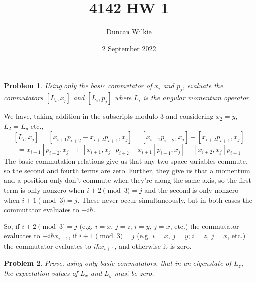\documentclass{article}
\title{4142 HW 1}
\author{Duncan Wilkie}
\date{2 September 2022}
\newtheorem{prob}{Problem}
\begin{document}
\maketitle

\begin{prob}
  Using only the basic commutator of $x_{i}$ and $p_{j}$, evaluate the commutators $[L_{i}, x_{j}]$ and $[L_{i}, p_{j}]$
  where $L_{i}$ is the angular momentum operator.
\end{prob}

We have, taking addition in the subscripts modulo 3 and considering $x_{2}=y$, $L_{2}=L_{y}$ etc.,
\[
  [L_{i}, x_{j}] = [x_{i+1}p_{i+2}-x_{i+2}p_{i+1}, x_{j}] = [x_{i+1}p_{i+2}, x_{j}] - [x_{i+2}p_{i+1}, x_{j}]
\]
\[
  = x_{i+1}[p_{i+2}, x_{j}] + [x_{i+1}, x_{j}]p_{i+2} - x_{i+1}[p_{i+1}, x_{j}] - [x_{i+2}, x_{j}]p_{i+1}
\]
The basic commutation relations give us that any two space variables commute, so the second and fourth terms are zero.
Further, they give us that a momentum and a position only don't commute when they're along the same axis,
so the first term is only nonzero when $i+2\pmod 3 = j$ and the second is only nonzero when $i+1\pmod 3 = j$.
These never occur simultaneously, but in both cases the commutator evaluates to $-i\hbar$.

So, if $i+2\pmod 3 = j$ (e.g. $i=x$, $j=z$; $i=y$, $j=x$, etc.) the commutator evaluates to $-i\hbar x_{i+1}$,
if $i+1\pmod 3 = j$ (e.g. $i=x$, $j=y$; $i=z$, $j=x$, etc.) the commutator evaluates to $i\hbar x_{i+1}$,
and otherwise it is zero.

\begin{prob}
  Prove, using only basic commutators, that in an eigenstate of $L_{z}$, the expectation values of $L_{x}$ and $L_{y}$ must be zero.
\end{prob}
\end{document}
